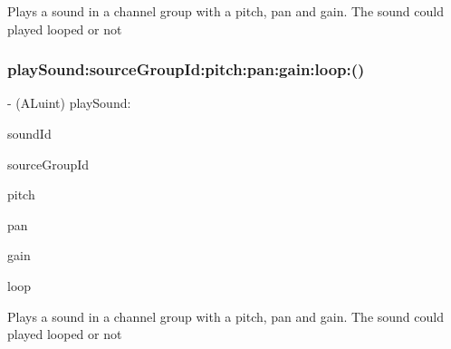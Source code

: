 Plays a sound in a channel group with a pitch, pan and gain. The sound could played looped or not \mbox{\label{interfaceCDSoundEngine_a03aee643e250635e2594e5ced4fbe7b2}} 
\subsubsection{\texorpdfstring{play\+Sound\+:source\+Group\+Id\+:pitch\+:pan\+:gain\+:loop\+:()}{playSound:sourceGroupId:pitch:pan:gain:loop:()}\hspace{0.1cm}{\footnotesize\ttfamily [3/4]}}
{\footnotesize\ttfamily -\/ (A\+Luint) play\+Sound\+: \begin{DoxyParamCaption}\item[{(int)}]{sound\+Id }\item[{sourceGroupId:(int)}]{source\+Group\+Id }\item[{pitch:(float)}]{pitch }\item[{pan:(float)}]{pan }\item[{gain:(float)}]{gain }\item[{loop:(B\+O\+OL)}]{loop }\end{DoxyParamCaption}}

Plays a sound in a channel group with a pitch, pan and gain. The sound could played looped or not

